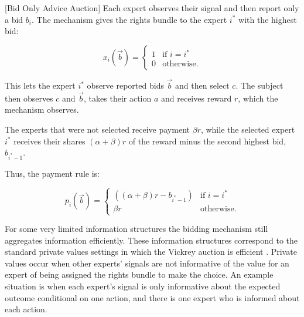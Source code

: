 \begin{mech}\label{mech:BidOnly}[Bid Only Advice Auction]
 	Each expert observes their signal and then report only a bid $b_i$. The mechanism gives the rights bundle to the expert $i^*$ with the highest bid:
 	
 	   $$x_i(\vec{b}) = \begin{cases} 1 & \text{if } i = i^* \\ 0 & \text{otherwise.} \end{cases}$$
	
 	
 	This lets the expert $i^*$ observe reported bids $\vec{b}$ and then select $c$.
 	The subject then observes $c$ and $\vec{b}$, takes their action $a$ and receives reward $r$, which the mechanism observes. 
 	
 	The experts that were not selected receive  payment $\beta r$, while the selected expert $i^*$ receives their shares $(\alpha + \beta) r$ of the reward minus the second highest bid, $b_{i^*-1}$.
 	
 	Thus, the payment rule is:
 	
 	$$p_i(\vec b)= \begin{cases} ((\alpha + \beta)r - b_{i^*-1})& \text{if }i = i^* \\ \beta r & \text{otherwise.} \end{cases}$$

 \end{mech}
 
 For some very limited information structures the bidding mechanism still aggregates information efficiently. 
 These information structures correspond to the standard private values settings in which the Vickrey auction is efficient \citep{vickrey1961}.
 Private values occur when other experts' signals are not informative of the value for an expert of being assigned the rights bundle to make the choice.%
 An example situation is when each expert's signal is only informative about the expected outcome conditional on one action, and  there is one expert who is informed about each action.
 
